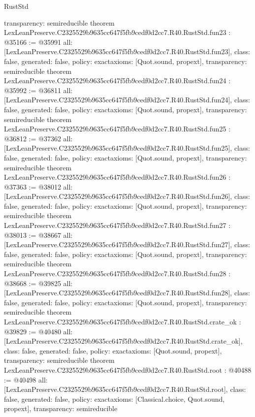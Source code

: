 \begin{lexlean}{RustStd}
\begin{coremodule}
{  transparency: semireducible
}
theorem LexLeanPreserve.C2325529b9635cc647f5fb9cedf0d2cc7.R40.RustStd.fun23 : @35166 := @35991 {
  all: [LexLeanPreserve.C2325529b9635cc647f5fb9cedf0d2cc7.R40.RustStd.fun23],
  class: false,
  generated: false,
  policy: exact{axioms: [Quot.sound, propext]},
  transparency: semireducible
}
theorem LexLeanPreserve.C2325529b9635cc647f5fb9cedf0d2cc7.R40.RustStd.fun24 : @35992 := @36811 {
  all: [LexLeanPreserve.C2325529b9635cc647f5fb9cedf0d2cc7.R40.RustStd.fun24],
  class: false,
  generated: false,
  policy: exact{axioms: [Quot.sound, propext]},
  transparency: semireducible
}
theorem LexLeanPreserve.C2325529b9635cc647f5fb9cedf0d2cc7.R40.RustStd.fun25 : @36812 := @37362 {
  all: [LexLeanPreserve.C2325529b9635cc647f5fb9cedf0d2cc7.R40.RustStd.fun25],
  class: false,
  generated: false,
  policy: exact{axioms: [Quot.sound, propext]},
  transparency: semireducible
}
theorem LexLeanPreserve.C2325529b9635cc647f5fb9cedf0d2cc7.R40.RustStd.fun26 : @37363 := @38012 {
  all: [LexLeanPreserve.C2325529b9635cc647f5fb9cedf0d2cc7.R40.RustStd.fun26],
  class: false,
  generated: false,
  policy: exact{axioms: [Quot.sound, propext]},
  transparency: semireducible
}
theorem LexLeanPreserve.C2325529b9635cc647f5fb9cedf0d2cc7.R40.RustStd.fun27 : @38013 := @38667 {
  all: [LexLeanPreserve.C2325529b9635cc647f5fb9cedf0d2cc7.R40.RustStd.fun27],
  class: false,
  generated: false,
  policy: exact{axioms: [Quot.sound, propext]},
  transparency: semireducible
}
theorem LexLeanPreserve.C2325529b9635cc647f5fb9cedf0d2cc7.R40.RustStd.fun28 : @38668 := @39825 {
  all: [LexLeanPreserve.C2325529b9635cc647f5fb9cedf0d2cc7.R40.RustStd.fun28],
  class: false,
  generated: false,
  policy: exact{axioms: [Quot.sound, propext]},
  transparency: semireducible
}
theorem LexLeanPreserve.C2325529b9635cc647f5fb9cedf0d2cc7.R40.RustStd.crate_ok : @39829 := @40480 {
  all: [LexLeanPreserve.C2325529b9635cc647f5fb9cedf0d2cc7.R40.RustStd.crate_ok],
  class: false,
  generated: false,
  policy: exact{axioms: [Quot.sound, propext]},
  transparency: semireducible
}
theorem LexLeanPreserve.C2325529b9635cc647f5fb9cedf0d2cc7.R40.RustStd.root : @40488 := @40498 {
  all: [LexLeanPreserve.C2325529b9635cc647f5fb9cedf0d2cc7.R40.RustStd.root],
  class: false,
  generated: false,
  policy: exact{axioms: [Classical.choice, Quot.sound, propext]},
  transparency: semireducible
}


\end{coremodule}
\end{lexlean}
